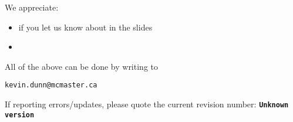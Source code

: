 \documentclass[11pt]{beamer}
\newcommand{\hgversion}{Unknown version}
\begin{document}
	\begin{frame}\frametitle{}
		We appreciate:
		\begin{itemize}
			\item	if you let us know about {} in the slides
			\item	{}
		\end{itemize}
		\vskip24pt
		All of the above can be done by writing to
		\begin{exampleblock}{}
			\begin{center}
				{\Large \tt kevin.dunn@mcmaster.ca}
			\end{center}
		\end{exampleblock}
		\vskip12pt
		{\scriptsize If reporting errors/updates, please quote the current revision number: \textbf{\tt \hgversion}}
	\end{frame}


\end{document}
